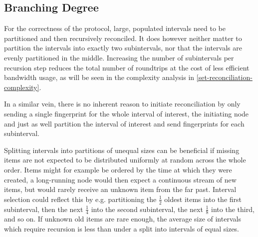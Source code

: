 \subsection{Branching Degree}

For the correctness of the protocol, large, populated intervals need to be partitioned and then recursively reconciled. It does however neither matter to partition the intervals into exactly two subintervals, nor that the intervals are evenly partitioned in the middle. Increasing the number of subintervals per recursion step reduces the total number of roundtrips at the cost of less efficient bandwidth usage, as will be seen in the complexity analysis in \cref{set-reconciliation-complexity}.

In a similar vein, there is no inherent reason to initiate reconciliation by only sending a single fingerprint for the whole interval of interest, the initiating node and just as well partition the interval of interest and send fingerprints for each subinterval.

Splitting intervals into partitions of unequal sizes can be beneficial if missing items are not expected to be distributed uniformly at random across the whole order. Items might for example be ordered by the time at which they were created, a long-running node would then expect a continuous stream of new items, but would rarely receive an unknown item from the far past. Interval selection could reflect this by e.g. partitioning the $\frac{1}{2}$ oldest items into the first subinterval, then the next $\frac{1}{4}$ into the second subinterval, the next $\frac{1}{8}$ into the third, and so on. If unknown old items are rare enough, the average size of intervals which require recursion is less than under a split into intervals of equal sizes.

